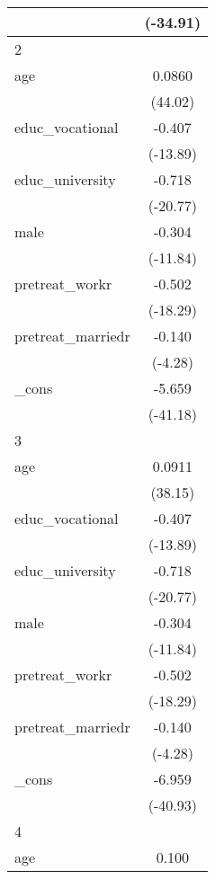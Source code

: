 {\begin{tabular}{l*{1}{c}}
            &    (-34.91)         \\
\hline
2           &                     \\
age         &      0.0860\sym{***}\\
            &     (44.02)         \\
[1em]
educ\_vocational&      -0.407\sym{***}\\
            &    (-13.89)         \\
[1em]
educ\_university&      -0.718\sym{***}\\
            &    (-20.77)         \\
[1em]
male        &      -0.304\sym{***}\\
            &    (-11.84)         \\
[1em]
pretreat\_workr&      -0.502\sym{***}\\
            &    (-18.29)         \\
[1em]
pretreat\_marriedr&      -0.140\sym{***}\\
            &     (-4.28)         \\
[1em]
\_cons      &      -5.659\sym{***}\\
            &    (-41.18)         \\
\hline
3           &                     \\
age         &      0.0911\sym{***}\\
            &     (38.15)         \\
[1em]
educ\_vocational&      -0.407\sym{***}\\
            &    (-13.89)         \\
[1em]
educ\_university&      -0.718\sym{***}\\
            &    (-20.77)         \\
[1em]
male        &      -0.304\sym{***}\\
            &    (-11.84)         \\
[1em]
pretreat\_workr&      -0.502\sym{***}\\
            &    (-18.29)         \\
[1em]
pretreat\_marriedr&      -0.140\sym{***}\\
            &     (-4.28)         \\
[1em]
\_cons      &      -6.959\sym{***}\\
            &    (-40.93)         \\
\hline
4           &                     \\
age         &       0.100\sym{***}\\

\end{tabular}}
